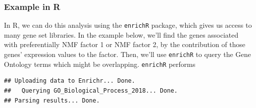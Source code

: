 \documentclass[12pt,]{krantz}
\newenvironment{Shaded}{\begin{snugshade}}{\end{snugshade}}
\newcommand{\DataTypeTok}[1]{\textcolor[rgb]{0.13,0.29,0.53}{#1}}
\newcommand{\DecValTok}[1]{\textcolor[rgb]{0.00,0.00,0.81}{#1}}
\newcommand{\FloatTok}[1]{\textcolor[rgb]{0.00,0.00,0.81}{#1}}
\newcommand{\KeywordTok}[1]{\textcolor[rgb]{0.13,0.29,0.53}{\textbf{#1}}}
\newcommand{\NormalTok}[1]{#1}
\newcommand{\OperatorTok}[1]{\textcolor[rgb]{0.81,0.36,0.00}{\textbf{#1}}}
\newcommand{\StringTok}[1]{\textcolor[rgb]{0.31,0.60,0.02}{#1}}
\begin{document}
\hypertarget{example-in-r}{%
\subsubsection{Example in R}\label{example-in-r}}

In R, we can do this analysis using the \texttt{enrichR} package, which gives us access to many gene set libraries. In the example below, we'll find the genes associated with preferentially NMF factor 1 or NMF factor 2, by the contribution of those genes' expression values to the factor. Then, we'll use \texttt{enrichR} to query the Gene Ontology terms which might be overlapping. \texttt{enrichR} performs

\begin{Shaded}
\end{Shaded}

\begin{verbatim}
## Uploading data to Enrichr... Done.
##   Querying GO_Biological_Process_2018... Done.
## Parsing results... Done.
\end{verbatim}

\begin{Shaded}
\end{Shaded}
\end{document}
